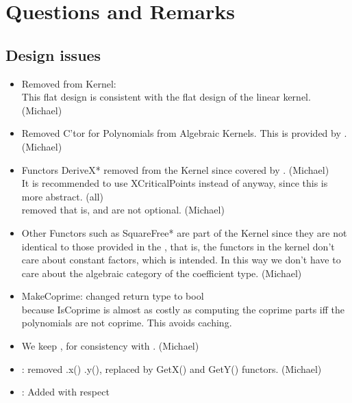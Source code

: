 
\section{Questions and Remarks}

\subsection{Design issues}

\begin{itemize}
\item 
Removed  from Kernel:\\
This flat design is consistent with the flat design of the linear kernel. 
(Michael)
\item 
Removed C'tor for Polynomials from Algebraic Kernels. 
This is provided by .
(Michael)
\item 
Functors DeriveX* removed from the Kernel since covered by 
.
(Michael)\\
It is recommended to use XCriticalPoints instead of  
anyway, since this is more abstract. (all)\\
removed  that is, 
 and  are not optional.
(Michael)
\item
Other Functors such as SquareFree* are part of the Kernel since they are not 
identical to those provided in the , that is, 
the functors in the 
kernel don't care about constant factors, which is intended. In this way we 
don't have to care about the algebraic category of the coefficient type. 
(Michael)
\item 
MakeCoprime: changed return type to bool\\
because IsCoprime is almost as costly as computing the coprime
parts iff the polynomials are not coprime. This avoids caching. 
\item
We keep , for consistency with .
(Michael)
\item 
{}: removed .x() .y(), replaced by GetX() and 
GetY() functors.
(Michael)
\item {}: Added  with respect 

\end{itemize}
